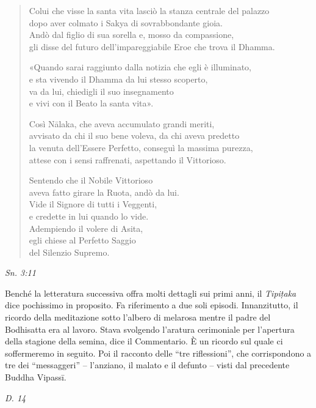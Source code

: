 \begin{quote}
Colui che visse la santa vita lasciò la stanza centrale del palazzo \\
dopo aver colmato i Sakya di sovrabbondante gioia. \\
Andò dal figlio di sua sorella e, mosso da compassione, \\
gli disse del futuro dell’impareggiabile Eroe che trova il Dhamma.


«Quando sarai raggiunto dalla notizia che egli è illuminato, \\
e sta vivendo il Dhamma da lui stesso scoperto, \\
va da lui, chiedigli il suo insegnamento \\
e vivi con il Beato la santa vita».


Così Nālaka, che aveva accumulato grandi meriti, \\
avvisato da chi il suo bene voleva, da chi aveva predetto \\
la venuta dell’Essere Perfetto, conseguì la massima purezza, \\
attese con i sensi raffrenati, aspettando il Vittorioso.


Sentendo che il Nobile Vittorioso \\
aveva fatto girare la Ruota, andò da lui. \\
Vide il Signore di tutti i Veggenti, \\
e credette in lui quando lo vide. \\
Adempiendo il volere di Asita, \\
egli chiese al Perfetto Saggio \\
del Silenzio Supremo.
\end{quote}

\emph{Sn. 3:11}


 Benché la letteratura successiva offra molti dettagli
sui primi anni, il \emph{Tipiṭaka} dice pochissimo in proposito. Fa
riferimento a due soli episodi. Innanzitutto, il ricordo della
meditazione sotto l’albero di melarosa mentre il padre del Bodhisatta
era al lavoro. Stava svolgendo l’aratura cerimoniale per l’apertura
della stagione della semina, dice il Commentario. È un ricordo sul quale
ci soffermeremo in seguito. Poi il racconto delle “tre riflessioni”, che
corrispondono a tre dei “messaggeri” – l’anziano, il malato e il defunto
– visti dal precedente Buddha Vipassī.


\emph{D. 14}


